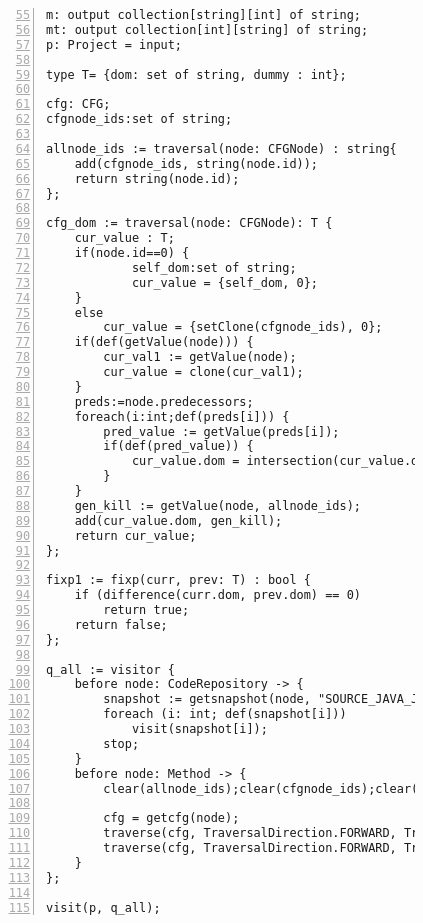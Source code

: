 \begin{figure}[ht!]
\begin{lstlisting}[numbers=left, tabsize=4, escapechar=@, caption={Dominator analysis},label={lst:dominator-code},firstline=55, firstnumber=55] 
m: output collection[string][int] of string;
mt: output collection[int][string] of string;
p: Project = input;

type T= {dom: set of string, dummy : int};

cfg: CFG;
cfgnode_ids:set of string;

allnode_ids := traversal(node: CFGNode) : string{
	add(cfgnode_ids, string(node.id));
	return string(node.id);
};

cfg_dom := traversal(node: CFGNode): T {
	cur_value : T;
	if(node.id==0) {
			self_dom:set of string;
			cur_value = {self_dom, 0};
	}
	else
		cur_value = {setClone(cfgnode_ids), 0};
	if(def(getValue(node))) {
		cur_val1 := getValue(node);
		cur_value = clone(cur_val1);
	}
	preds:=node.predecessors;
	foreach(i:int;def(preds[i])) {
		pred_value := getValue(preds[i]);
		if(def(pred_value)) {
			cur_value.dom = intersection(cur_value.dom,pred_value.dom);
		}
	}	
	gen_kill := getValue(node, allnode_ids);
	add(cur_value.dom, gen_kill);
	return cur_value;
};

fixp1 := fixp(curr, prev: T) : bool {
 	if (difference(curr.dom, prev.dom) == 0)
 		return true;	
 	return false;
};

q_all := visitor {
	before node: CodeRepository -> {
		snapshot := getsnapshot(node, "SOURCE_JAVA_JLS");
		foreach (i: int; def(snapshot[i]))
			visit(snapshot[i]);
		stop;
	}
	before node: Method -> {
		clear(allnode_ids);clear(cfgnode_ids);clear(cfg_dom);

		cfg = getcfg(node);
		traverse(cfg, TraversalDirection.FORWARD, TraversalKind.HYBRID, allnode_ids);
		traverse(cfg, TraversalDirection.FORWARD, TraversalKind.HYBRID, cfg_dom, fixp1);
	}
};

visit(p, q_all);

\end{lstlisting}
\end{figure}


